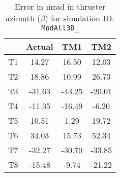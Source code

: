 \begin{table}[H]
\centering
\cprotect\caption{Error in mrad in thruster azimuth ($\beta$) for simulation ID:\\
\verb|ModAll3D_|}
\begin{tabular}{|c|c|c|c|} \hline
~ & Actual & TM1 & TM2 \\ \hline
T1 & 14.27 & 16.50 & 12.03 \\
T2 & 18.86 & 10.99 & 26.73 \\
T3 & -31.63 & -43.25 & -20.01 \\
T4 & -11.35 & -16.49 & -6.20 \\
T5 & 10.51 & 1.29 & 19.72 \\
T6 & 34.03 & 15.73 & 52.34 \\
T7 & -32.27 & -30.70 & -33.85 \\
T8 & -15.48 & -9.74 & -21.22 \\ \hline
\end{tabular}
\label{beta-7}
\end{table}
